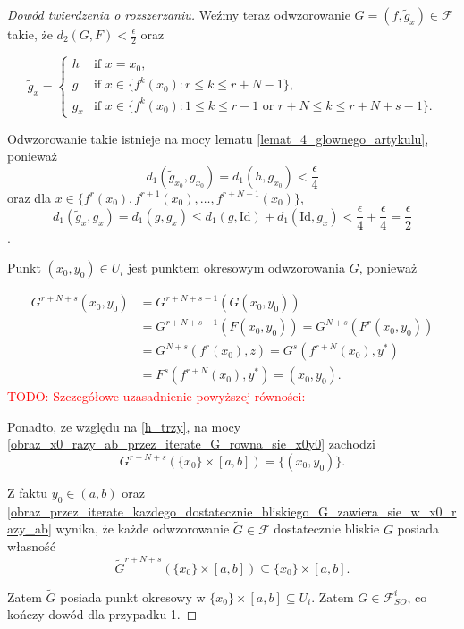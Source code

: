 \documentclass[licencjacka]{pwr_wmat_praca_dyplomowa}
\theoremstyle{plain}
\numberwithin{theorem}{chapter}
\theoremstyle{definition}
\numberwithin{theorem}{chapter}
\begin{document}
\begin{proof}[Dowód twierdzenia o rozszerzaniu]
Weźmy teraz odwzorowanie $G = (f, \widetilde{g}_x) \in \mathcal{F}$ takie, że $d_2(G, F) < \frac{\epsilon}{2}$ oraz

\begin{equation}
    \widetilde{g}_x =
    \begin{cases}
        h & \text{if $x=x_0$,}\\
        g & \text{if $x \in \{f^k(x_0) : r \leq k \leq r+N-1\}$,}\\
        g_x & \text{if $x \in \{f^k(x_0) : 1 \leq k \leq r-1$ or $r+N \leq k \leq r+N+s-1\}$.}
    \end{cases}
\end{equation}

Odwzorowanie takie istnieje na mocy lematu \ref{lemat_4_glownego_artykulu}, ponieważ
$$d_1(\widetilde{g}_{x_0}, g_{x_0}) = d_1(h, g_{x_0}) < \frac{\epsilon}{4}$$
oraz dla $x \in \{f^r(x_0), f^{r+1}(x_0), \ldots, f^{r+N-1}(x_0)\}$,
$$d_1(\widetilde{g}_x, g_x) = d_1(g, g_x) \leq d_1(g, \mathrm{Id}) + d_1(\mathrm{Id}, g_x) < \frac{\epsilon}{4} + \frac{\epsilon}{4} = \frac{\epsilon}{2}$$.

Punkt $(x_0, y_0) \in U_i$ jest punktem okresowym odwzorowania $G$, ponieważ

\begin{equation}
\begin{split}
G^{r+N+s}(x_0, y_0) & = G^{r+N+s-1}(G(x_0, y_0)) \\
& = G^{r+N+s-1}(F(x_0, y_0)) = G^{N+s}(F^r(x_0, y_0)) \\
& = G^{N+s}(f^r(x_0), z) = G^s(f^{r+N}(x_0), y^*) \\
& = F^s(f^{r+N}(x_0), y^*) = (x_0, y_0).
\end{split}
\end{equation}
\textcolor{red}{TODO: Szczegółowe uzasadnienie powyższej równości:}

Ponadto, ze względu na \ref{h_trzy}, na mocy \ref{obraz_x0_razy_ab_przez_iterate_G_rowna_sie_x0y0} zachodzi
$$G^{r+N+s}(\{x_0\} \times [a, b]) = \{(x_0, y_0)\}.$$

Z faktu $y_0 \in (a, b)$ oraz \ref{obraz_przez_iterate_kazdego_dostatecznie_bliskiego_G_zawiera_sie_w_x0_razy_ab} wynika, że każde odwzorowanie $\widetilde{G} \in \mathcal{F}$ dostatecznie bliskie $G$ posiada własność
$$\widetilde{G}^{r+N+s}(\{x_0\} \times [a, b]) \subseteq \{x_0\} \times [a, b].$$


Zatem $\widetilde{G}$ posiada punkt okresowy w $\{x_0\} \times [a, b] \subseteq U_i$. Zatem $G \in \mathcal{F}_{SO}^i$, co kończy dowód dla przypadku 1.


\end{proof}
\end{document}
